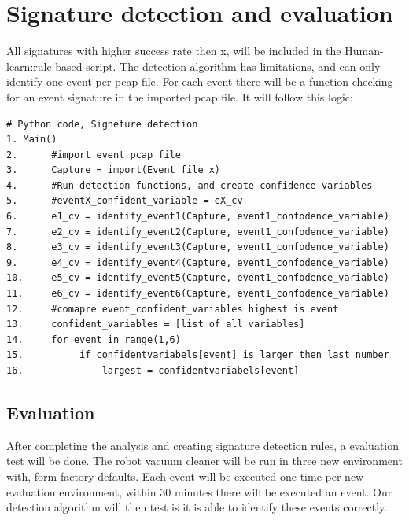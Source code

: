 \section{Signature detection and evaluation}
All signatures with higher success rate then x, will be included in the Human-learn:rule-based script. The detection algorithm has limitations, and can only identify one event per pcap file. For each event there will be a function checking for an event signature in the imported pcap file. It will follow this logic:
\\

\begin{lstlisting}
# Python code, Signeture detection
1. Main()
2.      #import event pcap file
3.      Capture = import(Event_file_x)
4.      #Run detection functions, and create confidence variables
5.      #eventX_confident_variable = eX_cv  
6.      e1_cv = identify_event1(Capture, event1_confodence_variable)
7.      e2_cv = identify_event2(Capture, event1_confodence_variable)
8.      e3_cv = identify_event3(Capture, event1_confodence_variable)
9.      e4_cv = identify_event4(Capture, event1_confodence_variable)
10.     e5_cv = identify_event5(Capture, event1_confodence_variable)
11.     e6_cv = identify_event6(Capture, event1_confodence_variable)
12.     #comapre event_confident_variables highest is event
13.     confident_variables = [list of all variables]
14.     for event in range(1,6)
15.          if confidentvariabels[event] is larger then last number
16.              largest = confidentvariabels[event]  
\end{lstlisting}

\subsection{Evaluation}
After completing the analysis and creating signature detection rules, a evaluation test will be done. The robot vacuum cleaner will be run in three new environment with, form factory defaults. Each event will be executed one time per new evaluation environment, within 30 minutes there will be executed an event. Our detection algorithm will then test is it is able to identify these events correctly. 